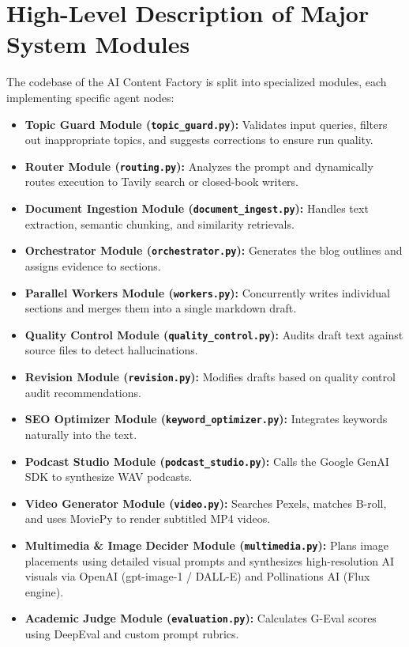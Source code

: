 \section{High-Level Description of Major System Modules}

The codebase of the AI Content Factory is split into specialized modules, each implementing specific agent nodes:
\begin{itemize}
    \item \textbf{Topic Guard Module (\texttt{topic\_guard.py}):} Validates input queries, filters out inappropriate topics, and suggests corrections to ensure run quality.
    \item \textbf{Router Module (\texttt{routing.py}):} Analyzes the prompt and dynamically routes execution to Tavily search or closed-book writers.
    \item \textbf{Document Ingestion Module (\texttt{document\_ingest.py}):} Handles text extraction, semantic chunking, and similarity retrievals.
    \item \textbf{Orchestrator Module (\texttt{orchestrator.py}):} Generates the blog outlines and assigns evidence to sections.
    \item \textbf{Parallel Workers Module (\texttt{workers.py}):} Concurrently writes individual sections and merges them into a single markdown draft.
    \item \textbf{Quality Control Module (\texttt{quality\_control.py}):} Audits draft text against source files to detect hallucinations.
    \item \textbf{Revision Module (\texttt{revision.py}):} Modifies drafts based on quality control audit recommendations.
    \item \textbf{SEO Optimizer Module (\texttt{keyword\_optimizer.py}):} Integrates keywords naturally into the text.
    \item \textbf{Podcast Studio Module (\texttt{podcast\_studio.py}):} Calls the Google GenAI SDK to synthesize WAV podcasts.
    \item \textbf{Video Generator Module (\texttt{video.py}):} Searches Pexels, matches B-roll, and uses MoviePy to render subtitled MP4 videos.
    \item \textbf{Multimedia \& Image Decider Module (\texttt{multimedia.py}):} Plans image placements using detailed visual prompts and synthesizes high-resolution AI visuals via OpenAI (gpt-image-1 / DALL-E) and Pollinations AI (Flux engine).
    \item \textbf{Academic Judge Module (\texttt{evaluation.py}):} Calculates G-Eval scores using DeepEval and custom prompt rubrics.
\end{itemize}

